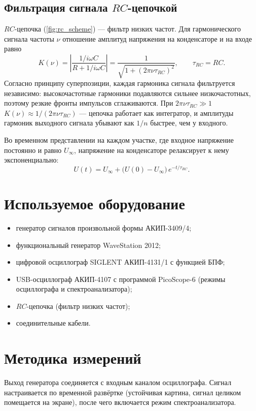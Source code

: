\documentclass[a4paper,12pt]{article}
\begin{document}
\subsection{Фильтрация сигнала $RC$-цепочкой}
$RC$-цепочка (\cref{fig:rc_scheme}) --- фильтр низких частот. Для
гармонического сигнала частоты $\nu$ отношение амплитуд напряжения на
конденсаторе и на входе равно
\begin{equation}
    \label{eq:rc_filter}
    K(\nu) = \left|\frac{1/i\omega C}{R + 1/i\omega C}\right|
    = \frac{1}{\sqrt{1 + (2\pi\nu\tau_{RC})^2}},
    \qquad \tau_{RC} = RC.
\end{equation}
Согласно принципу суперпозиции, каждая гармоника сигнала фильтруется
независимо: высокочастотные гармоники подавляются сильнее низкочастотных,
поэтому резкие фронты импульсов сглаживаются. При $2\pi\nu\tau_{RC}\gg1$
$K(\nu)\approx 1/(2\pi\nu\tau_{RC})$ --- цепочка работает как
интегратор, и амплитуды гармоник выходного сигнала убывают как $1/n$
быстрее, чем у входного.

Во временном представлении на каждом участке, где входное напряжение
постоянно и равно $U_\infty$, напряжение на конденсаторе релаксирует к нему
экспоненциально:
\begin{equation}
    \label{eq:rc_transient}
    U(t) = U_\infty + \bigl(U(0) - U_\infty\bigr)\,e^{-t/\tau_{RC}}.
\end{equation}

\section{Используемое оборудование}
\begin{itemize}
    \item генератор сигналов произвольной формы АКИП-3409/4;
    \item функциональный генератор WaveStation 2012;
    \item цифровой осциллограф SIGLENT АКИП-4131/1 с функцией БПФ;
    \item USB-осциллограф АКИП-4107 с программой PicoScope-6 (режимы
          осциллографа и спектроанализатора);
    \item $RC$-цепочка (фильтр низких частот);
    \item соединительные кабели.
\end{itemize}

\section{Методика измерений}
Выход генератора соединяется с входным каналом осциллографа. Сигнал
настраивается по временной развёртке (устойчивая картина, сигнал целиком
помещается на экране), после чего включается режим спектроанализатора.
\end{document}
